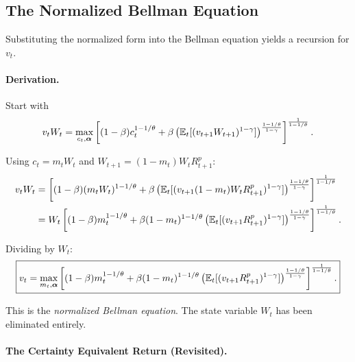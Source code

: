 \subsection{The Normalized Bellman Equation}
\label{subsec:normalized-bellman}

Substituting the normalized form into the Bellman equation yields a recursion for $v_t$.

\paragraph{Derivation.}

Start with
\begin{equation}
v_t W_t = \max_{c_t, \boldsymbol{\alpha}} \left[ (1-\beta) c_t^{1-1/\theta} + \beta \left( \mathbb{E}_t[(v_{t+1} W_{t+1})^{1-\gamma}] \right)^{\frac{1-1/\theta}{1-\gamma}} \right]^{\frac{1}{1-1/\theta}}.
\label{eq:bellman-substituted}
\end{equation}

Using $c_t = m_t W_t$ and $W_{t+1} = (1 - m_t) W_t R_{t+1}^p$:
\begin{align}
v_t W_t &= \left[ (1-\beta) (m_t W_t)^{1-1/\theta} + \beta \left( \mathbb{E}_t[(v_{t+1} (1-m_t) W_t R_{t+1}^p)^{1-\gamma}] \right)^{\frac{1-1/\theta}{1-\gamma}} \right]^{\frac{1}{1-1/\theta}} \notag \\
&= W_t \left[ (1-\beta) m_t^{1-1/\theta} + \beta (1-m_t)^{1-1/\theta} \left( \mathbb{E}_t[(v_{t+1} R_{t+1}^p)^{1-\gamma}] \right)^{\frac{1-1/\theta}{1-\gamma}} \right]^{\frac{1}{1-1/\theta}}.
\label{eq:bellman-factored}
\end{align}

Dividing by $W_t$:
\begin{equation}
\boxed{v_t = \max_{m_t, \boldsymbol{\alpha}} \left[ (1-\beta) m_t^{1-1/\theta} + \beta (1-m_t)^{1-1/\theta} \left( \mathbb{E}_t[(v_{t+1} R_{t+1}^p)^{1-\gamma}] \right)^{\frac{1-1/\theta}{1-\gamma}} \right]^{\frac{1}{1-1/\theta}}.}
\label{eq:normalized-bellman}
\end{equation}

This is the \emph{normalized Bellman equation}. The state variable $W_t$ has been eliminated entirely.

\paragraph{The Certainty Equivalent Return (Revisited).}

